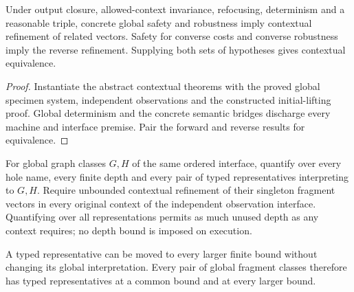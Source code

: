 

\begin{lemma}
Under output closure, allowed-context invariance, refocusing, determinism and a reasonable triple, concrete global safety and robustness imply contextual refinement of related vectors. Safety for converse costs and converse robustness imply the reverse refinement. Supplying both sets of hypotheses gives contextual equivalence.
\end{lemma}

\begin{proof}
Instantiate the abstract contextual theorems with the proved global specimen system, independent observations and the constructed initial-lifting proof. Global determinism and the concrete semantic bridges discharge every machine and interface premise. Pair the forward and reverse results for equivalence.
\end{proof}






\begin{definition}
For global graph classes $G,H$ of the same ordered interface, quantify over every hole name, every finite depth and every pair of typed representatives interpreting to $G,H$. Require unbounded contextual refinement of their singleton fragment vectors in every original context of the independent observation interface. Quantifying over all representations permits as much unused depth as any context requires; no depth bound is imposed on execution.
\end{definition}



\begin{lemma}
A typed representative can be moved to every larger finite bound without changing its global interpretation. Every pair of global fragment classes therefore has typed representatives at a common bound and at every larger bound.
\end{lemma}

